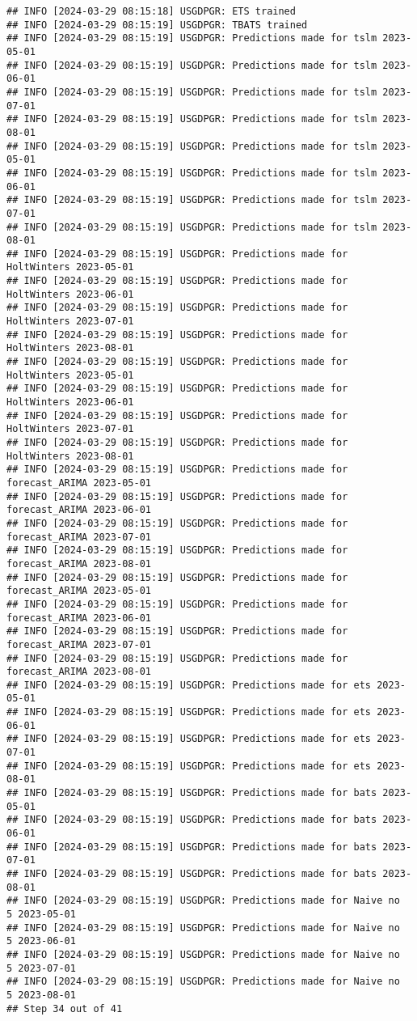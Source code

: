\documentclass[
]{article}
\begin{document}
\begin{verbatim}
## INFO [2024-03-29 08:15:18] USGDPGR: ETS trained
## INFO [2024-03-29 08:15:19] USGDPGR: TBATS trained
## INFO [2024-03-29 08:15:19] USGDPGR: Predictions made for tslm 2023-05-01
## INFO [2024-03-29 08:15:19] USGDPGR: Predictions made for tslm 2023-06-01
## INFO [2024-03-29 08:15:19] USGDPGR: Predictions made for tslm 2023-07-01
## INFO [2024-03-29 08:15:19] USGDPGR: Predictions made for tslm 2023-08-01
## INFO [2024-03-29 08:15:19] USGDPGR: Predictions made for tslm 2023-05-01
## INFO [2024-03-29 08:15:19] USGDPGR: Predictions made for tslm 2023-06-01
## INFO [2024-03-29 08:15:19] USGDPGR: Predictions made for tslm 2023-07-01
## INFO [2024-03-29 08:15:19] USGDPGR: Predictions made for tslm 2023-08-01
## INFO [2024-03-29 08:15:19] USGDPGR: Predictions made for HoltWinters 2023-05-01
## INFO [2024-03-29 08:15:19] USGDPGR: Predictions made for HoltWinters 2023-06-01
## INFO [2024-03-29 08:15:19] USGDPGR: Predictions made for HoltWinters 2023-07-01
## INFO [2024-03-29 08:15:19] USGDPGR: Predictions made for HoltWinters 2023-08-01
## INFO [2024-03-29 08:15:19] USGDPGR: Predictions made for HoltWinters 2023-05-01
## INFO [2024-03-29 08:15:19] USGDPGR: Predictions made for HoltWinters 2023-06-01
## INFO [2024-03-29 08:15:19] USGDPGR: Predictions made for HoltWinters 2023-07-01
## INFO [2024-03-29 08:15:19] USGDPGR: Predictions made for HoltWinters 2023-08-01
## INFO [2024-03-29 08:15:19] USGDPGR: Predictions made for forecast_ARIMA 2023-05-01
## INFO [2024-03-29 08:15:19] USGDPGR: Predictions made for forecast_ARIMA 2023-06-01
## INFO [2024-03-29 08:15:19] USGDPGR: Predictions made for forecast_ARIMA 2023-07-01
## INFO [2024-03-29 08:15:19] USGDPGR: Predictions made for forecast_ARIMA 2023-08-01
## INFO [2024-03-29 08:15:19] USGDPGR: Predictions made for forecast_ARIMA 2023-05-01
## INFO [2024-03-29 08:15:19] USGDPGR: Predictions made for forecast_ARIMA 2023-06-01
## INFO [2024-03-29 08:15:19] USGDPGR: Predictions made for forecast_ARIMA 2023-07-01
## INFO [2024-03-29 08:15:19] USGDPGR: Predictions made for forecast_ARIMA 2023-08-01
## INFO [2024-03-29 08:15:19] USGDPGR: Predictions made for ets 2023-05-01
## INFO [2024-03-29 08:15:19] USGDPGR: Predictions made for ets 2023-06-01
## INFO [2024-03-29 08:15:19] USGDPGR: Predictions made for ets 2023-07-01
## INFO [2024-03-29 08:15:19] USGDPGR: Predictions made for ets 2023-08-01
## INFO [2024-03-29 08:15:19] USGDPGR: Predictions made for bats 2023-05-01
## INFO [2024-03-29 08:15:19] USGDPGR: Predictions made for bats 2023-06-01
## INFO [2024-03-29 08:15:19] USGDPGR: Predictions made for bats 2023-07-01
## INFO [2024-03-29 08:15:19] USGDPGR: Predictions made for bats 2023-08-01
## INFO [2024-03-29 08:15:19] USGDPGR: Predictions made for Naive no  5 2023-05-01
## INFO [2024-03-29 08:15:19] USGDPGR: Predictions made for Naive no  5 2023-06-01
## INFO [2024-03-29 08:15:19] USGDPGR: Predictions made for Naive no  5 2023-07-01
## INFO [2024-03-29 08:15:19] USGDPGR: Predictions made for Naive no  5 2023-08-01
## Step 34 out of 41
\end{verbatim}
\end{document}
